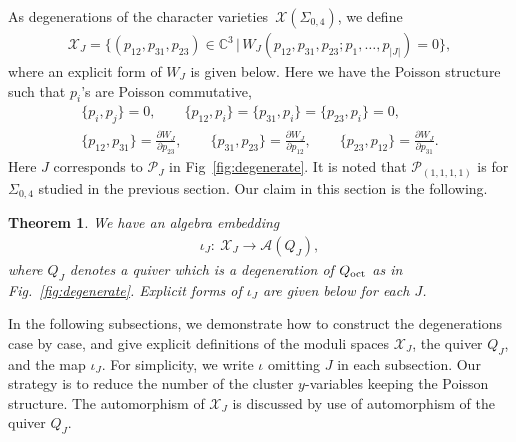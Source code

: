\documentclass[10pt,a4paper]{amsart}
\numberwithin{equation}{section}
\newtheorem{Theorem}{Theorem}[section]
\begin{document}
As degenerations of the character varieties~$\mathcal{X}(\Sigma_{0,4})$, we define
\begin{gather*}
 \mathcal{X}_J = \big\{( p_{12}, p_{31}, p_{23}) \in \mathbb{C}^3 \,|\, W_J(p_{12}, p_{31},p_{23}; p_1,\dots, p_{|J|}) =0 \big\} ,
\end{gather*}
where an explicit form of $W_J$ is given below. Here we have the Poisson structure such that $p_i$'s are Poisson commutative,
\begin{gather*}
\{ p_i , p_j\} =0, \qquad \{ p_{12} , p_i \}= \{ p_{31}, p_i \}= \{ p_{23} , p_i\} = 0 , \\
\{ p_{12} , p_{31}\} = \frac{\partial W_J}{\partial p_{23}} ,\qquad \{ p_{31} , p_{23} \} = \frac{\partial W_J}{\partial p_{12}} ,\qquad \{ p_{23} , p_{12} \} = \frac{\partial W_J}{\partial p_{31}} .
\end{gather*}
Here $J$ corresponds to $\mathcal{P}_J$ in Fig~\ref{fig:degenerate}. It is noted that $\mathcal{P}_{(1,1,1,1)}$ is for $\Sigma_{0,4}$ studied in the previous section. Our claim in this section is the following.
\begin{Theorem} \label{thm:degenerate} We have an algebra embedding
\begin{gather*}
\iota_J\colon \ \mathcal{X}_J \to \mathcal{A}(Q_J),
\end{gather*}
where $Q_J$ denotes a quiver which is a degeneration of $Q_{\text{\rm oct}}$ as in Fig.~{\rm \ref{fig:degenerate}}. Explicit forms of $\iota_J$ are given below for each $J$.
\end{Theorem}

In the following subsections, we demonstrate how to construct the degenerations case by case, and give explicit definitions of the moduli spaces $\mathcal{X}_J$, the quiver $Q_J$, and the map $\iota_J$. For simplicity, we write $\iota$ omitting $J$ in each subsection. Our strategy is to reduce the number of the cluster $y$-variables keeping the Poisson structure. The automorphism of $\mathcal{X}_J$ is discussed by use of automorphism of the quiver $Q_J$.
\end{document}
